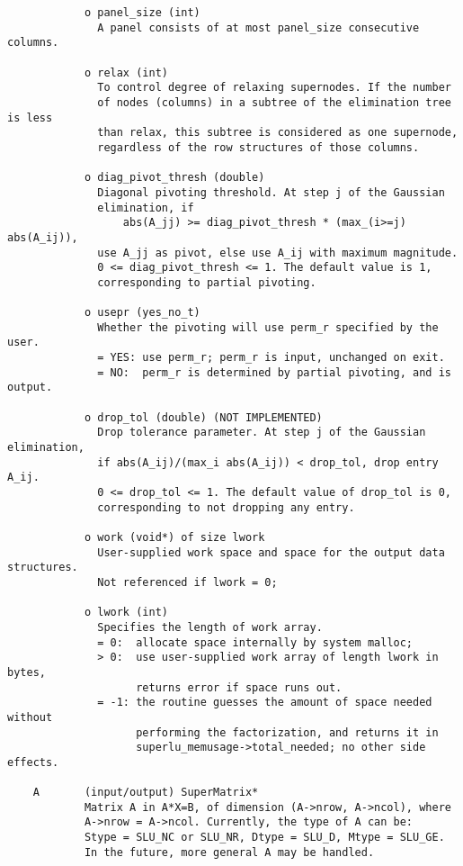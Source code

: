 \begin{verbatim}
            o panel_size (int)
              A panel consists of at most panel_size consecutive columns.

            o relax (int)
              To control degree of relaxing supernodes. If the number
              of nodes (columns) in a subtree of the elimination tree is less
              than relax, this subtree is considered as one supernode,
              regardless of the row structures of those columns.

            o diag_pivot_thresh (double)
              Diagonal pivoting threshold. At step j of the Gaussian 
              elimination, if 
                  abs(A_jj) >= diag_pivot_thresh * (max_(i>=j) abs(A_ij)),
              use A_jj as pivot, else use A_ij with maximum magnitude. 
              0 <= diag_pivot_thresh <= 1. The default value is 1, 
              corresponding to partial pivoting.

            o usepr (yes_no_t)
              Whether the pivoting will use perm_r specified by the user.
              = YES: use perm_r; perm_r is input, unchanged on exit.
              = NO:  perm_r is determined by partial pivoting, and is output.

            o drop_tol (double) (NOT IMPLEMENTED)
              Drop tolerance parameter. At step j of the Gaussian elimination,
              if abs(A_ij)/(max_i abs(A_ij)) < drop_tol, drop entry A_ij.
              0 <= drop_tol <= 1. The default value of drop_tol is 0,
              corresponding to not dropping any entry.

            o work (void*) of size lwork
              User-supplied work space and space for the output data structures.
              Not referenced if lwork = 0;

            o lwork (int)
              Specifies the length of work array.
              = 0:  allocate space internally by system malloc;
              > 0:  use user-supplied work array of length lwork in bytes,
                    returns error if space runs out.
              = -1: the routine guesses the amount of space needed without
                    performing the factorization, and returns it in
                    superlu_memusage->total_needed; no other side effects.

    A       (input/output) SuperMatrix*
            Matrix A in A*X=B, of dimension (A->nrow, A->ncol), where
            A->nrow = A->ncol. Currently, the type of A can be:
            Stype = SLU_NC or SLU_NR, Dtype = SLU_D, Mtype = SLU_GE.
            In the future, more general A may be handled.


\end{verbatim}
